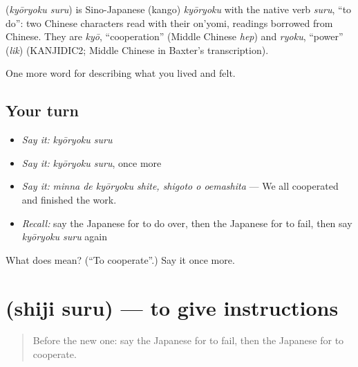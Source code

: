 \begin{cousinweb}
\textbf{} (\emph{kyōryoku suru}) is Sino-Japanese (kango) \emph{kyōryoku} with the native verb \emph{suru}, \textquotedblleft{}to do\textquotedblright{}: two Chinese characters read with their on'yomi, readings borrowed from Chinese. They are \emph{kyō}, \textquotedblleft{}cooperation\textquotedblright{} (Middle Chinese \emph{hep}) and \emph{ryoku}, \textquotedblleft{}power\textquotedblright{} (\emph{lik}) (KANJIDIC2; Middle Chinese in Baxter's transcription).
\end{cousinweb}

\begin{grammarlens}[title={What you've built}]
One more word for describing what you lived and felt.
\end{grammarlens}

\subsection*{Your turn}
\begin{itemize}
\raggedright
  \item \emph{Say it:} \emph{kyōryoku suru}
  \item \emph{Say it:} \emph{kyōryoku suru}, once more
  \item \emph{Say it:} \emph{minna de kyōryoku shite, shigoto o oemashita} — We all cooperated and finished the work.
  \item \emph{Recall:} say the Japanese for to do over, then the Japanese for to fail, then say \emph{kyōryoku suru} again
\end{itemize}

\begin{tcolorbox}[breakable,colback=teal!4,colframe=teal!35!black,title={Before you move on}]
What does  mean? (\textquotedblleft{}To cooperate\textquotedblright{}.) Say it once more.
\end{tcolorbox}
\section[\texorpdfstring{\ja{しじする} (shiji suru)}{しじする (shiji suru)}]{ (shiji suru) — to give instructions}

\label{lesson:JA-C455-shiji-suru}



\begin{quote}
Before the new one: say the Japanese for to fail, then the Japanese for to cooperate.
\end{quote}

